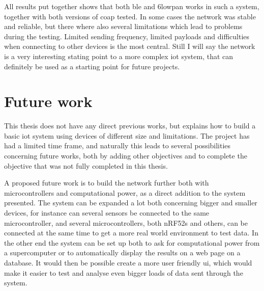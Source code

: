 \noindent All results put together shows that both \gls{ble} and \gls{6lowpan} works in such a system, together with both versions of \gls{coap} tested. In some cases the network was stable and reliable, but there where also several limitations which lead to problems during the testing. Limited sending frequency, limited payloads and difficulties when connecting to other devices is the most central. Still I will say the network is a very interesting stating point to a more complex \gls{iot} system, that can definitely be used as a starting point for future projects. 


\section{Future work}

\noindent This thesis does not have any direct previous works, but explains how to build a basic \gls{iot} system using devices of different size and limitations. The project has had a limited time frame, and naturally this leads to several possibilities concerning future works, both by adding other objectives and to complete the objective that was not fully completed in this thesis. 

\noindent A proposed future work is to build the network further both with \glspl{microcontroller} and computational power, as a direct addition to the system presented. The system can be expanded a lot both concerning bigger and smaller devices, for instance can several sensors be connected to the same \gls{microcontroller}, and several \glspl{microcontroller}, both \glspl{nRF52} and others, can be connected at the same time to get a more real world environment to test data. In the other end the system can be set up both to ask for computational power from a supercomputer or to automatically display the results on a web page on a database. It would then be possible create a more user friendly \gls{ui}, which would make it easier to test and analyse even bigger loads of data sent through the system. 






